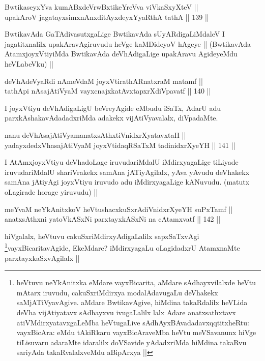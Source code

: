 \begin{shl}
BwtikaseyxYva kumABxdeVrwBxtikeYreVva viVkaSxyXteV ||  \\
upakAroV jagatayxsimxnAnxditAyxdeyxYyaRthA tathA ||  139 ||  
\end{shl}

\begin{artha}
BwtikavAda GaTAdivasutxgaLige BwtikavAda sUyARdigaLiMdaleV I jagatitxnalilx upakAravAgiruvudu heVge kaMDideyoV hAgeye || (BwtikavAda AtamxjoyxVtiyiMda BwtikavAda deVhAdigaLige upakAravu AgideyeMdu heVLabeVku) ||
\end{artha}


\begin{shl}
deVhAdeVyaRdi nAmeVdaM joyxVtirathARnatxraM matamf ||  \\
tathA\s pi nAsajAtiVyaM vayxcnajxkatAvxtapxrXdiVpavatf ||  140 ||  
\end{shl}

\begin{artha}
I joyxVtiyu deVhAdigaLigU beVreyAgide eMbudu iSaTx, AdarU adu parxkAshakavAdadadxriMda adakekx vijAtiVyavalalx, diVpadaMte.
\end{artha}


\begin{shl}
nanu deVhAsajAtiVyamanatxsAthxtiVnidxrXyatavxtaH ||  \\
yadayxdedxVhasajAtiVyaM joyxVtidaqRSaTxM tadinidxrXyeYH ||  141 ||  
\end{shl}

\begin{artha}
I AtAmxjoyxVtiyu deVhadoLage iruvudariMdalU iMdirxyagaLige tiLiyade iruvudariMdalU shariVrakekx samAna jATiyAgilalx, yAva yAvudu deVhakekx samAna jAtiyAgi  joyxVtiyu iruvudo adu iMdirxyagaLige kANuvudu. (matutx oLagirade horage yiruvudu) ||
\end{artha}


\begin{shl}
meYvaM neYkAnitxkoV heVtushacxkuSxrAdiVnidxrXyeYH suPxTamf || \\
anatxsAthxni yatoV\s kASxNi parxtayxkASxNi na cA\s \s tamxvatf ||  142 ||  
\end{shl}

\begin{artha}
hiVgalalx, heVtuvu cakuSxriMdirxyAdigaLalilx sapxSaTxvAgi \footnote{heVtuvu neYkAnitxka eMdare vayxBicarita, aMdare sAdhayxvilalxde heVtu mAtarx iruvudu, cakuSxriMdirxya modalAdavugaLu deVhakekx saMjATiVyavAgive. aMdare BwtikavAgive, hiMdina takaRdalilx heVLida deVha vijAtiyatavx sAdhayxvu ivugaLalilx lalx Adare anatxsathxtavx atiVMdirxyatavxgaLeMba heVtugaLive sAdhAyxBAvadadavxqqtitxheRtu: vayxBicAra: eMdu tAkiRkaru vayxBicAraveMba heVtu meVSavanunx hiVge tiLisuvaru adaraMte idaralilx doVSavide yAdadxriMda hiMdina takaRvu sariyAda takaRvalalxveMdu aBipArxya ||}vayxBicaritavAgide, EkeMdare? iMdirxyagaLu oLagidadxrU AtamxnaMte parxtayxkaSxvAgilalx ||
\end{artha}

